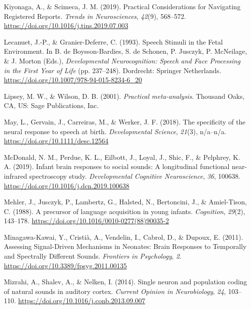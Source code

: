 \documentclass[man]{apa6}
\begin{document}
\hypertarget{ref-kiyonaga_practical_2019}{}
Kiyonaga, A., \& Scimeca, J. M. (2019). Practical Considerations for
Navigating Registered Reports. \emph{Trends in Neurosciences},
\emph{42}(9), 568--572. \url{https://doi.org/10.1016/j.tins.2019.07.003}

\hypertarget{ref-lecanuet_speech_1993}{}
Lecanuet, J.-P., \& Granier-Deferre, C. (1993). Speech Stimuli in the
Fetal Environment. In B. de Boysson-Bardies, S. de Schonen, P. Jusczyk,
P. McNeilage, \& J. Morton (Eds.), \emph{Developmental Neurocognition:
Speech and Face Processing in the First Year of Life} (pp. 237--248).
Dordrecht: Springer Netherlands.
\url{https://doi.org/10.1007/978-94-015-8234-6_20}

\hypertarget{ref-lipsey_practical_2001}{}
Lipsey, M. W., \& Wilson, D. B. (2001). \emph{Practical meta-analysis}.
Thousand Oaks, CA, US: Sage Publications, Inc.

\hypertarget{ref-may_specificity_2018}{}
May, L., Gervain, J., Carreiras, M., \& Werker, J. F. (2018). The
specificity of the neural response to speech at birth.
\emph{Developmental Science}, \emph{21}(3), n/a--n/a.
\url{https://doi.org/10.1111/desc.12564}

\hypertarget{ref-mcdonald_infant_2019}{}
McDonald, N. M., Perdue, K. L., Eilbott, J., Loyal, J., Shic, F., \&
Pelphrey, K. A. (2019). Infant brain responses to social sounds: A
longitudinal functional near-infrared spectroscopy study.
\emph{Developmental Cognitive Neuroscience}, \emph{36}, 100638.
\url{https://doi.org/10.1016/j.dcn.2019.100638}

\hypertarget{ref-mehler_precursor_1988}{}
Mehler, J., Jusczyk, P., Lambertz, G., Halsted, N., Bertoncini, J., \&
Amiel-Tison, C. (1988). A precursor of language acquisition in young
infants. \emph{Cognition}, \emph{29}(2), 143--178.
\url{https://doi.org/10.1016/0010-0277(88)90035-2}

\hypertarget{ref-minagawa-kawai_assessing_2011}{}
Minagawa-Kawai, Y., Cristià, A., Vendelin, I., Cabrol, D., \& Dupoux, E.
(2011). Assessing Signal-Driven Mechanisms in Neonates: Brain Responses
to Temporally and Spectrally Different Sounds. \emph{Frontiers in
Psychology}, \emph{2}. \url{https://doi.org/10.3389/fpsyg.2011.00135}

\hypertarget{ref-mizrahi_single_2014}{}
Mizrahi, A., Shalev, A., \& Nelken, I. (2014). Single neuron and
population coding of natural sounds in auditory cortex. \emph{Current
Opinion in Neurobiology}, \emph{24}, 103--110.
\url{https://doi.org/10.1016/j.conb.2013.09.007}
\end{document}
